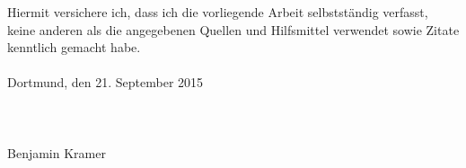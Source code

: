 \thispagestyle{empty}
\normalsize
\normalfont
\noindent
Hiermit versichere ich, dass ich die vorliegende Arbeit selbstständig verfasst,
keine anderen als die angegebenen Quellen und Hilfsmittel verwendet sowie
Zitate kenntlich gemacht habe.\\\\

Dortmund, den 21. September 2015 \\\\\\\\

Benjamin Kramer
